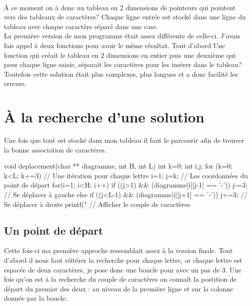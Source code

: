 \documentclass{article}
\begin{document}
\\\`A ce moment on à donc un tableau en 2 dimensions de pointeurs qui pointent vers des tableaux de caractères? Chaque ligne entrée est stocké dans une ligne du tableau avec chaque caractère séparé dans une case.
\\
La première version de mon programme était assez différente de celle-ci. J'avais fais appel à deux fonctions pour avoir le même résultat. Tout d'abord Une fonction qui créait le tableau en 2 dimensions en entier puis une deuxième qui pour chaque ligne saisie, séparait les caractères pour les insérer dans le tableau? Toutefois cette solution était plus complexes, plus longues et a donc facilité les erreurs.

\section{\`A la recherche d'une solution}

Une fois que tout est stocké dans mon tableau il faut le parcourir afin de trouver la bonne association de caractères.

\begin{boxedverbatim}
  void deplacement(char ** diagramme, int H, int L)
{
    int k=0;
    int i,j;
    for (k=0; k<L; k+=3)
    {
        // Une itération pour chaque lettre
        i=1;
        j=k;
        // Les coordonnées du point de départ
        for(i=1; i<H; i++)
        {
            if ((j>1) && (diagramme[i][j-1] == '-'))
            {
              j-=3;
              // Se déplacer à gauche
            }
            else if ((j<L-1) && (diagramme[i][j+1] == '-'))
            {
              j+=3;
              // Se déplacer à droite
            }
          }
        printf("%
        // Afficher le couple de caractères
      }
}
\end{boxedverbatim}

\subsection{Un point de départ}
Cette fois-ci ma première approche ressemblait assez à la version finale. Tout d'abord il nous faut réitérer la recherche pour chaque lettre, or chaque lettre est espacée de deux caractères, je pose donc une boucle pour avec un pas de 3.
Une fois qu'on est à la recherche du couple de caractères on connaît la postition de départ du premier des deux : au niveau de la première ligne et sur la colonne donnée par la boucle.
\end{document}
